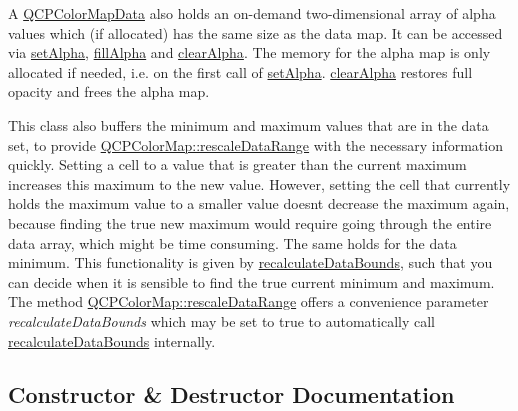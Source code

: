 A \hyperlink{class_q_c_p_color_map_data}{Q\+C\+P\+Color\+Map\+Data} also holds an on-\/demand two-\/dimensional array of alpha values which (if allocated) has the same size as the data map. It can be accessed via \hyperlink{class_q_c_p_color_map_data_aaf7de5b34c58f38d8f4c1ceb064a876c}{set\+Alpha}, \hyperlink{class_q_c_p_color_map_data_a93e2a549d7702bc849cd48a585294657}{fill\+Alpha} and \hyperlink{class_q_c_p_color_map_data_a14d08b9c3720cd719400079b86d3906b}{clear\+Alpha}. The memory for the alpha map is only allocated if needed, i.\+e. on the first call of \hyperlink{class_q_c_p_color_map_data_aaf7de5b34c58f38d8f4c1ceb064a876c}{set\+Alpha}. \hyperlink{class_q_c_p_color_map_data_a14d08b9c3720cd719400079b86d3906b}{clear\+Alpha} restores full opacity and frees the alpha map.

This class also buffers the minimum and maximum values that are in the data set, to provide \hyperlink{class_q_c_p_color_map_a856608fa3dd1cc290bcd5f29a5575774}{Q\+C\+P\+Color\+Map\+::rescale\+Data\+Range} with the necessary information quickly. Setting a cell to a value that is greater than the current maximum increases this maximum to the new value. However, setting the cell that currently holds the maximum value to a smaller value doesn\textquotesingle{}t decrease the maximum again, because finding the true new maximum would require going through the entire data array, which might be time consuming. The same holds for the data minimum. This functionality is given by \hyperlink{class_q_c_p_color_map_data_ab235ade8a4d64bd3adb26a99b3dd57ee}{recalculate\+Data\+Bounds}, such that you can decide when it is sensible to find the true current minimum and maximum. The method \hyperlink{class_q_c_p_color_map_a856608fa3dd1cc290bcd5f29a5575774}{Q\+C\+P\+Color\+Map\+::rescale\+Data\+Range} offers a convenience parameter {\itshape recalculate\+Data\+Bounds} which may be set to true to automatically call \hyperlink{class_q_c_p_color_map_data_ab235ade8a4d64bd3adb26a99b3dd57ee}{recalculate\+Data\+Bounds} internally. 

\subsection{Constructor \& Destructor Documentation}
